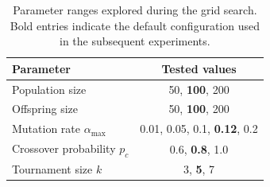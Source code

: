 \documentclass[a4paper,10pt]{article}
\begin{document}


\begin{table}[H]
	\centering
	\begin{tabular}{lc}
		\hline
		Parameter                         & Tested values                       \\
		\hline
		Population size                   & 50, \textbf{100}, 200               \\
		Offspring size                    & 50, \textbf{100}, 200               \\
		Mutation rate $\alpha_\text{max}$ & 0.01, 0.05, 0.1, \textbf{0.12}, 0.2 \\
		Crossover probability $p_c$       & 0.6, \textbf{0.8}, 1.0              \\
		Tournament size $k$               & 3, \textbf{5}, 7                    \\
		\hline
	\end{tabular}
	\captionsetup{width=0.8\textwidth}
	\caption{Parameter ranges explored during the grid search. Bold entries indicate the default configuration used in the subsequent experiments.}
	\label{tab:parameters}
\end{table}

\end{document}
